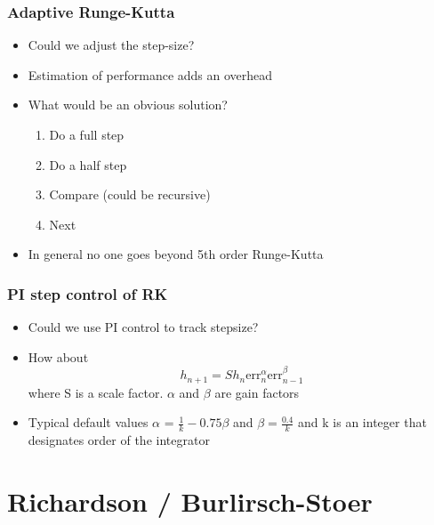 \documentclass[10pt]{beamer}
\begin{document}
\begin{frame}
  \frametitle{Adaptive Runge-Kutta}
  \begin{itemize}
  \item Could we adjust the step-size? 
  \item Estimation of performance adds an overhead
  \item What would be an obvious solution? \pause
    \begin{enumerate}
    \item Do a full step
    \item Do a half step
    \item Compare (could be recursive)
    \item Next
    \end{enumerate}
  \item In general no one goes beyond 5th order Runge-Kutta
  \end{itemize}
\end{frame}

\begin{frame}
  \frametitle{PI step control of RK}
  \begin{itemize}
  \item Could we use PI control to track stepsize? \pause
  \item How about
    \[
      h_{n+1} = S h_n \mbox{err}_n^{\alpha} \mbox{err}_{n-1}^{\beta}
    \]
    where S is a scale factor. $\alpha$ and $\beta$ are gain factors
  \item Typical default values $\alpha$ = $\frac{1}{k} - 0.75 \beta$
    and $\beta = \frac{0.4}{k}$ and k is an integer that designates
    order of the integrator
  \end{itemize}
\end{frame}
\section{Richardson / Burlirsch-Stoer}
\end{document}
